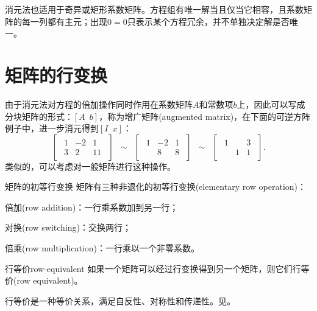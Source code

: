 \begin{remark}
	消元法也适用于奇异或矩形系数矩阵。方程组有唯一解当且仅当它相容，且系数矩阵的每一列都有主元；出现$0=0$只表示某个方程冗余，并不单独决定解是否唯一。
\end{remark}

\section{矩阵的行变换}

由于消元法对方程的倍加操作同时作用在系数矩阵$A$和常数项$b$上，因此可以写成分块矩阵的形式：$[A\enspace b]$，称为增广矩阵(augmented matrix)，在下面的可逆方阵例子中，进一步消元得到$[I\enspace x]$：
\[
	\begin{bmatrix}
		\begin{array}{cc|c}
			1&-2&1\\3&2&11
		\end{array}
	\end{bmatrix}
	\enspace\sim\enspace
	\begin{bmatrix}
		\begin{array}{cc|c}
			1&-2&1\\ &8&8
		\end{array}
	\end{bmatrix}
	\enspace\sim\enspace
	\begin{bmatrix}
		\begin{array}{cc|c}
			1&&3\\ &1&1
		\end{array}
	\end{bmatrix}.
\]
类似的，可以考虑对一般矩阵进行这种操作。

\begin{definition}{矩阵的初等行变换}{}
	矩阵有三种非退化的初等行变换(elementary row operation)：
	\begin{compactitem}
		\item 倍加(row addition)：一行乘系数加到另一行；
		\item 对换(row switching)：交换两行；
		\item 倍乘(row multiplication)：一行乘以一个非零系数。
	\end{compactitem}
\end{definition}

\begin{definition}{行等价}{row-equivalent}
	如果一个矩阵可以经过行变换得到另一个矩阵，则它们行等价(row equivalent)。
\end{definition}

\begin{remark}
	行等价是一种等价关系，满足自反性、对称性和传递性。见。
\end{remark}

